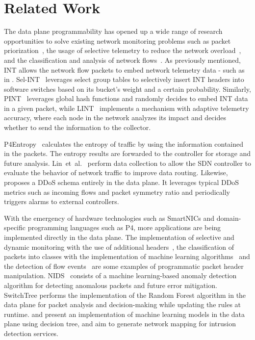 \section{Related Work}
The data plane programmability has opened up a wide range of research opportunities to solve existing network monitoring problems such as packet priorization~\cite{tr19_p4_int_vnf}, the usage of selective telemetry to reduce the network overload~\cite{tr18_selective_in-band}, and the classification and analysis of network flows~\cite{tr19_flowstalker}. As previously mentioned, INT allows the network flow packets to embed network telemetry data - such as in \cite{tang2019sel,ben2020pint,tr21_lint}.
%
Sel-INT~\cite{tang2019sel} leverages select group tables to selectively insert INT headers into software switches based on its bucket's weight and a certain probability.
%
Similarly, PINT~\cite{ben2020pint} leverages global hash functions and randomly decides to embed INT data in a given packet,
%
while LINT~\cite{tr21_lint} implements a mechanism with adaptive telemetry accuracy, where each node in the network analyzes its impact and decides whether to send the information to the collector.

P4Entropy~\cite{tr20_estimating_log} calculates the entropy of traffic by using the information contained in the packets. The entropy results are forwarded to the controller for storage and future analysis. Lin~et~al.~\cite{tr21_network_telemetry_by} perform data collection to allow the SDN controller to evaluate the behavior of network traffic to improve data routing.
%
Likewise, \cite{tr20_multi-feature} proposes a DDoS schema entirely in the data plane. It leverages typical DDoS metrics such as incoming flows and packet symmetry ratio and periodically triggers alarms to external controllers.

With the emergency of hardware technologies such as SmartNICs and domain-specific programming languages such as P4, more applications are being implemented directly in the data plane. The implementation of selective and dynamic monitoring with the use of additional headers~\cite{tr19_sampling-based}, the classification of packets into classes with the implementation of machine learning algorithms~\cite{tr19_do_switches_dream} and the detection of flow events~\cite{tr20_flow_event} are some examples of programmatic packet header manipulation.
%
NIDS~\cite{tr20_anomaly_detection} consists of a machine learning-based anomaly detection algorithm for detecting anomalous packets and future error mitigation. %
SwitchTree \cite{tr20_switchtree} performs the implementation of the Random Forest algorithm in the data plane for packet analysis and decision-making while updating the rules at runtime. \cite{tr21_programmable_sw} and \cite{tr19_do_switches_dream, tr20_switchtree} present an implementation of machine learning models in the data plane using decision tree, and aim to generate network mapping for intrusion detection services.

